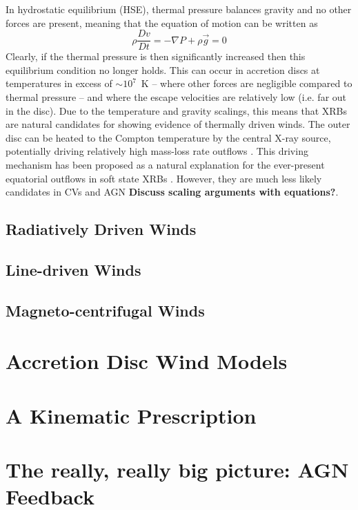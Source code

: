 In hydrostatic equilibrium (HSE), thermal pressure balances gravity and no other forces 
are present, meaning that the equation of motion can be written as 
\begin{equation}
\label{eq:hse}
\rho \frac{Dv}{Dt} = -\nabla P +  \rho \vec{g} = 0
\end{equation}
Clearly, if the thermal pressure is then significantly 
increased then this equilibrium condition no longer holds. 
This can occur in accretion discs at temperatures in excess of $\sim10^7$~K --
where other forces are negligible compared to thermal pressure -- 
and where the escape velocities are relatively low (i.e. far out in the disc).
Due to the temperature and gravity scalings, this means
that XRBs are natural candidates for showing evidence of thermally driven
winds. The outer disc can be heated to the Compton temperature by the central X-ray source,
potentially driving relatively high mass-loss rate outflows \citep{begelman1983,woods1996}. 
This driving mechanism has been proposed as a natural explanation
for the ever-present equatorial outflows in soft state XRBs \citep{ponti2012}.
However, they are much less likely candidates in CVs and AGN {\bf Discuss scaling
arguments with equations?}.


\subsection{Radiatively Driven Winds}

\subsection{Line-driven Winds}

\subsection{Magneto-centrifugal Winds}

\section{Accretion Disc Wind Models}


\section{A Kinematic Prescription}




\section{The really, really big picture: AGN Feedback}

